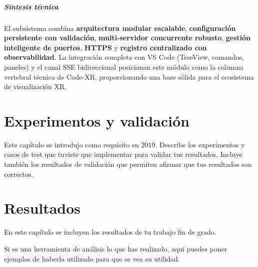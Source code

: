 \documentclass[a4paper, 12pt]{book}
\begin{document}
\paragraph{Síntesis técnica}
El subsistema combina \textbf{arquitectura modular escalable}, \textbf{configuración persistente con validación}, \textbf{multi-servidor concurrente robusto}, \textbf{gestión inteligente de puertos}, \textbf{HTTPS} y \textbf{registro centralizado con observabilidad}. La integración completa con VS Code (TreeView, comandos, paneles) y el canal SSE bidireccional posicionan este módulo como la columna vertebral técnica de Code-XR, proporcionando una base sólida para el ecosistema de visualización XR.

%

\cleardoublepage
\chapter{Experimentos y validación}
\label{chap:experimentos}

Este capítulo se introdujo como requisito en 2019. 
Describe los experimentos y casos de test que tuviste que implementar para validar tus resultados. 
Incluye también los resultados de validación que permiten afirmar que tus resultados son correctos. 



\cleardoublepage
\chapter{Resultados}
\label{chap:resultados}

En este capítulo se incluyen los resultados de tu trabajo fin de grado.

Si es una herramienta de análisis lo que has realizado, aquí puedes poner ejemplos de haberla utilizado para que se vea su utilidad.


\end{document}
